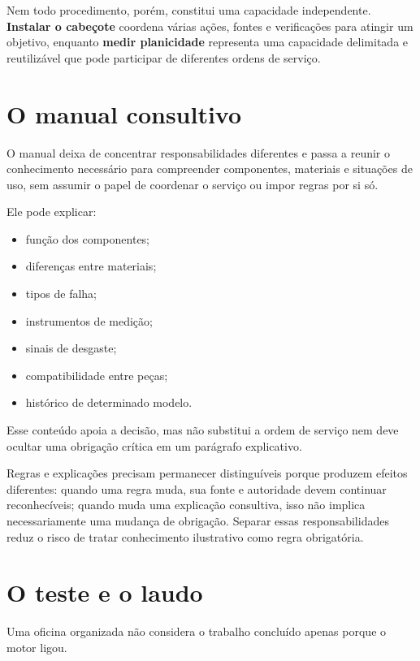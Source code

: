 \documentclass[
  10pt,
  a4paper,
  oneside]{book}
\providecommand{\tightlist}{%
  \setlength{\itemsep}{0pt}\setlength{\parskip}{0pt}}
\begin{document}
Nem todo procedimento, porém, constitui uma capacidade independente.
\textbf{Instalar o cabeçote} coordena várias ações, fontes e
verificações para atingir um objetivo, enquanto \textbf{medir
planicidade} representa uma capacidade delimitada e reutilizável que
pode participar de diferentes ordens de serviço.

\hypertarget{o-manual-consultivo}{%
\section{O manual consultivo}\label{o-manual-consultivo}}

O manual deixa de concentrar responsabilidades diferentes e passa a
reunir o conhecimento necessário para compreender componentes, materiais
e situações de uso, sem assumir o papel de coordenar o serviço ou impor
regras por si só.

Ele pode explicar:

\begin{itemize}
\tightlist
\item
  função dos componentes;
\item
  diferenças entre materiais;
\item
  tipos de falha;
\item
  instrumentos de medição;
\item
  sinais de desgaste;
\item
  compatibilidade entre peças;
\item
  histórico de determinado modelo.
\end{itemize}

Esse conteúdo apoia a decisão, mas não substitui a ordem de serviço nem
deve ocultar uma obrigação crítica em um parágrafo explicativo.

Regras e explicações precisam permanecer distinguíveis porque produzem
efeitos diferentes: quando uma regra muda, sua fonte e autoridade devem
continuar reconhecíveis; quando muda uma explicação consultiva, isso não
implica necessariamente uma mudança de obrigação. Separar essas
responsabilidades reduz o risco de tratar conhecimento ilustrativo como
regra obrigatória.

\hypertarget{o-teste-e-o-laudo}{%
\section{O teste e o laudo}\label{o-teste-e-o-laudo}}

Uma oficina organizada não considera o trabalho concluído apenas porque
o motor ligou.
\end{document}
